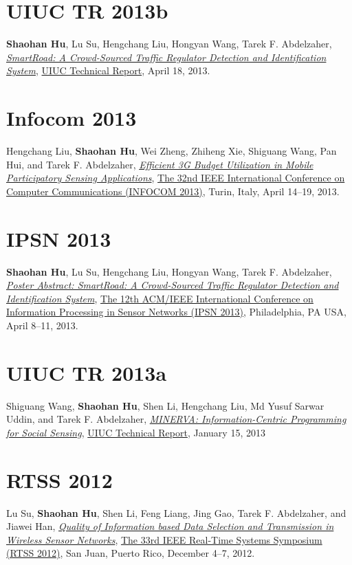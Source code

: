 \section{\sc UIUC TR 2013b}\hypertarget{hu2013uiuc1}{}
\textbf{Shaohan Hu}, Lu Su, Hengchang Liu, Hongyan Wang, Tarek F. Abdelzaher,
\href{https://www.ideals.illinois.edu/handle/2142/43856}{\emph{SmartRoad: A Crowd-Sourced Traffic Regulator Detection and Identification System}},
\href{http://www.ideals.illinois.edu}{\textsf{UIUC Technical Report}},
April 18, 2013.

\section{\sc Infocom 2013}\hypertarget{liu2013infocom}{}
Hengchang Liu, \textbf{Shaohan Hu}, Wei Zheng, Zhiheng Xie, Shiguang Wang, Pan Hui, and Tarek F. Abdelzaher,
\href{http://ieeexplore.ieee.org/xpl/articleDetails.jsp?arnumber=6566935}{\emph{Efficient 3G Budget Utilization in Mobile Participatory Sensing Applications}},
\href{http://infocom2013.ieee-infocom.org/}{\textsf{The 32nd IEEE International Conference on Computer Communications (INFOCOM 2013)}},
Turin, Italy, April 14--19, 2013.

\section{\sc IPSN 2013}\hypertarget{hu2013ipsn}{}
\textbf{Shaohan Hu}, Lu Su, Hengchang Liu, Hongyan Wang, Tarek F. Abdelzaher,
\href{http://portal.acm.org/citation.cfm?id=2461433}{\emph{Poster Abstract: SmartRoad: A Crowd-Sourced Traffic Regulator Detection and Identification System}},
\href{http://ipsn.acm.org/2013/}{\textsf{The 12th ACM/IEEE International Conference on Information Processing in Sensor Networks (IPSN 2013)}},
Philadelphia, PA USA, April 8--11, 2013.

\section{\sc UIUC TR 2013a}\hypertarget{wang2013uiuc}{}
Shiguang Wang, \textbf{Shaohan Hu}, Shen Li, Hengchang Liu, Md Yusuf Sarwar Uddin, and Tarek F. Abdelzaher,
\href{https://www.ideals.illinois.edu/handle/2142/42511}{\emph{MINERVA: Information-Centric Programming for Social Sensing}},
\href{http://www.ideals.illinois.edu}{\textsf{UIUC Technical Report}},
January 15, 2013

\section{\sc RTSS 2012}\hypertarget{su2012rtss}{}
Lu Su, \textbf{Shaohan Hu}, Shen Li, Feng Liang, Jing Gao, Tarek F. Abdelzaher, and Jiawei Han,
\href{http://ieeexplore.ieee.org/xpl/articleDetails.jsp?arnumber=6424815}{\emph{Quality of Information based Data Selection and Transmission in Wireless Sensor Networks}},
\href{http://sites.ieee.org/rtss2012/}{\textsf{The 33rd IEEE Real-Time Systems Symposium (RTSS 2012)}},
San Juan, Puerto Rico, December 4--7, 2012.

